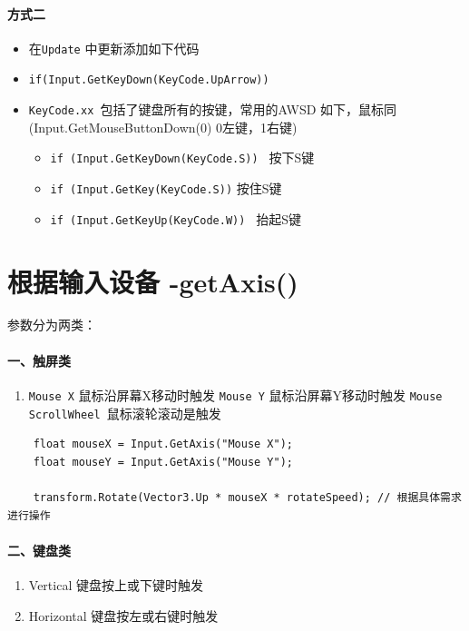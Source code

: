 \documentclass[UTF8,a4paper,12pt]{ctexbook}
\begin{document}
		\paragraph{方式二}
			\begin{itemize}
				\item 在\verb|Update| 中更新添加如下代码
				\item \verb|if(Input.GetKeyDown(KeyCode.UpArrow))| 
				\item \verb|KeyCode.xx |包括了键盘所有的按键，常用的AWSD 如下，鼠标同(Input.GetMouseButtonDown(0) 0左键，1右键)
					\begin{itemize}
						\item \verb|if (Input.GetKeyDown(KeyCode.S)) | 按下S键
						\item \verb|if (Input.GetKey(KeyCode.S))| 按住S键
						\item \verb|if (Input.GetKeyUp(KeyCode.W)) | 抬起S键
					\end{itemize}
			\end{itemize}
		
	\section{根据输入设备 -getAxis()}
		参数分为两类： 
		\paragraph{一、触屏类}
		 	\begin{enumerate}
			 	\item \verb|Mouse X| 鼠标沿屏幕X移动时触发 
			 	\verb|Mouse Y| 鼠标沿屏幕Y移动时触发 
			 	\verb|Mouse ScrollWheel |鼠标滚轮滚动是触发 
		 	\end{enumerate}
			
			\begin{lstlisting}
	float mouseX = Input.GetAxis("Mouse X");
	float mouseY = Input.GetAxis("Mouse Y");
	
	transform.Rotate(Vector3.Up * mouseX * rotateSpeed); // 根据具体需求进行操作
			\end{lstlisting}
		
		\paragraph{二、键盘类}
		 	\begin{enumerate}
		 		\item Vertical 键盘按上或下键时触发 
		 		\item Horizontal 键盘按左或右键时触发
		 	\end{enumerate}
		 	
\end{document}

